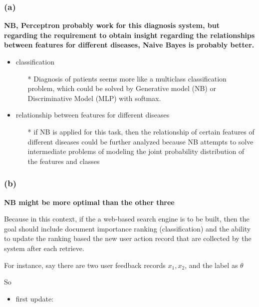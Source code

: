 \documentclass[11pt]{article}
\providecommand{\tightlist}{%
      \setlength{\itemsep}{0pt}\setlength{\parskip}{0pt}}
\begin{document}
    \subsubsection*{(a)}\label{a}

    \textbf{NB, Perceptron probably work for this diagnosis system, but
regarding the requirement to obtain insight regarding the relationships
between features for different diseases, Naive Bayes is probably
better.}

    \begin{itemize}
\tightlist
\item
  classification

  \begin{itemize}
  \tightlist
  \item[*]
    Diagnosis of patients seems more like a multiclass classification
    problem, which could be solved by Generative model (NB) or
    Discriminative Model (MLP) with softmax.
  \end{itemize}
\item
  relationship between features for different diseases

  \begin{itemize}
  \tightlist
  \item[*]
    if NB is applied for this task, then the relationship of certain
    features of different diseases could be further analyzed because NB
    attempts to solve intermediate problems of modeling the joint
    probability distribution of the features and classes
  \end{itemize}
\end{itemize}

    \subsubsection*{(b)}\label{b}

    \textbf{NB might be more optimal than the other three}

Because in this context, if the a web-based search engine is to be
built, then the goal should include document importance ranking
(classification) and the ability to update the ranking based the new
user action record that are collected by the system after each retrieve.

For instance, say there are two user feedback records \(x_1, x_2\), and
the label as \(\theta\)

So

\begin{itemize}
\tightlist
\item
  first update:
\end{itemize}
\end{document}
